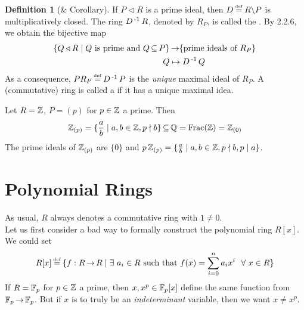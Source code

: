 \documentclass[11pt]{book}
\theoremstyle{definition}   \newtheorem{defn}[counter]{Definition} %
\newcommand{\bs}{\backslash}   \newcommand{\A}{\mathcal{A}}   \newcommand{\sy}{\textnormal{Syl}}   \newcommand{\size}[1]{\left| #1 \right|}
\newcommand\myeq{\mathrel{\overset{\makebox[0pt]{\mbox{\normalfont\tiny\sffamily \textrm{def}}}}{=}}}
\newcommand{\tl}{\triangleleft}   \newcommand{\sd}[1]{\rtimes_{#1}}   \newcommand{\x}{^{\times}}   \newcommand{\cyc}[1]{\begin{pmatrix} #1 \end{pmatrix}}
\DeclareMathOperator{\ra}{\rightarrow}   \DeclareMathOperator{\Poly}{\mathbf{P}}   \DeclareMathOperator{\spn}{\textnormal{span}}   \DeclareMathOperator{\aut}{\textnormal{Aut}}
\newcommand{\vs}{\vspace{8pt}}
\numberwithin{counter}{chapter}
\begin{document}
\vs

\begin{defn}[\& Corollary]
If $P \tl R$ is a prime ideal, then $D \myeq R \bs P$ is multiplicatively closed. The ring $D\operatorname{^{-1}} R$, denoted by $R_P$, is called the . By 2.2.6, we obtain the bijective map
\begin{align*}
\{Q \tl R \mid Q \tn{ is prime and } Q \sub P\} &\ra \{\tn{prime ideals of } R_P\} \\
Q &\mapsto D\inv Q
\end{align*}
As a consequence, $PR_P \myeq D\inv P$ is the \emph{unique} maximal ideal of $R_P$. A (commutative) ring is called a  if it has a unique maximal idea.
\end{defn}

\vs

\begin{example}
Let $R = \operatorname{\mathbb{Z}}$, $P = (p)$ for $p \in \operatorname{\mathbb{Z}}$ a prime. Then
\[\operatorname{\mathbb{Z}}_{(p)} = \{ \frac{a}{b} \mid a,b \in \operatorname{\mathbb{Z}}, p \nmid b\} \operatorname{\subseteq} \operatorname{\mathbb{Q}} = \textnormal{Frac}(\operatorname{\mathbb{Z}}) = \operatorname{\mathbb{Z}}_{(0)} \]
The prime ideals of $\operatorname{\mathbb{Z}}_{(p)}$ are $\{0\}$ and $p\operatorname{\mathbb{Z}}_{(p)} = \{\frac{a}{b} \mid a,b \in \operatorname{\mathbb{Z}}, p\nmid b, p \mid a\}$.
\end{example}

\vs

\chapter{ \null Polynomial Rings}

As usual, $R$ always denotes a commutative ring with $1 \ne 0$. \\

Let us first consider a bad way to formally construct the polynomial ring $R[x]$. We could set
	\[R[x] \myeq \{f : R \ra R \mid \exists \ a_i \in R \tn{ such that } f(x) = \sum_{i=0}^n a_i x^i \ \ \forall \ x \in R\} \]
If $R = \mathbb{F}_p$ for $p \in \operatorname{\mathbb{Z}}$ a prime, then $x,x^p \in \mathbb{F}_p[x]$ define the same function from $\mbb{F}_p \ra \mbb{F}_p$. But if $x$ is to truly be an \emph{indeterminant} variable, then we want $x \ne x^p$.

\vs
\end{document}

